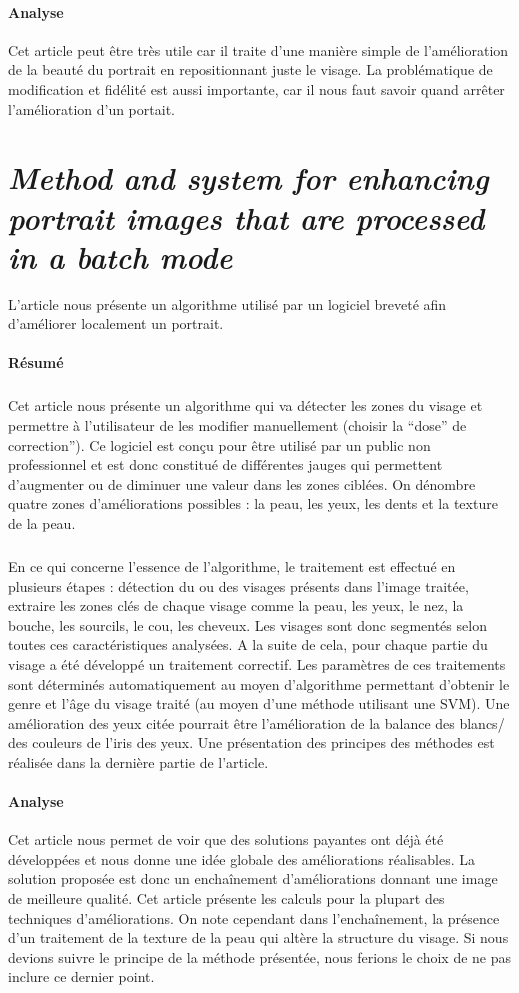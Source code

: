 \documentclass[11pt, french]{report-rd-info}
\begin{document}
\paragraph{Analyse}
Cet article peut être très utile car il traite d'une manière simple de l'amélioration de la beauté du portrait en repositionnant juste le visage. La problématique de modification et fidélité est aussi importante, car il nous faut savoir quand arrêter l'amélioration d'un portait.


\section{\emph{Method and system for enhancing portrait images that are processed in a batch mode}}
L'article \cite{Matraszek2004} nous présente un algorithme utilisé par un logiciel breveté afin d'améliorer localement un portrait.

\paragraph{Résumé}
\subparagraph{}
Cet article nous présente un algorithme qui va détecter les zones du visage et permettre à l'utilisateur de les modifier manuellement (choisir la “dose” de correction”). Ce logiciel est conçu pour être utilisé par un public non professionnel et est donc constitué de différentes jauges qui permettent d'augmenter ou de diminuer une valeur dans les zones ciblées. On dénombre quatre zones d'améliorations possibles : la peau, les yeux, les dents et la texture de la peau.
\subparagraph{}
En ce qui concerne l’essence de l’algorithme, le traitement est effectué en plusieurs étapes : détection du ou des visages présents dans l’image traitée, extraire les zones clés de chaque visage comme la peau, les yeux, le nez, la bouche, les sourcils, le cou, les cheveux. Les visages sont donc segmentés selon toutes ces caractéristiques analysées. A la suite de cela, pour chaque partie du visage a été développé un traitement correctif. Les paramètres de ces traitements sont déterminés automatiquement au moyen d’algorithme permettant d’obtenir le genre et l’âge du visage traité (au moyen d’une méthode utilisant une SVM).
Une amélioration des yeux citée pourrait être l’amélioration de la balance des blancs/ des couleurs de l’iris des yeux. Une présentation des principes des méthodes est réalisée dans la dernière partie de l’article.

\paragraph{Analyse}
Cet article nous permet de voir que des solutions payantes ont déjà été développées et nous donne une idée globale des améliorations réalisables. La solution proposée est donc un enchaînement d’améliorations donnant une image de meilleure qualité. Cet article présente les calculs pour la plupart des techniques d’améliorations. On note cependant dans l'enchaînement, la présence d’un traitement de la texture de la peau qui altère la structure du visage. Si nous devions suivre le principe de la méthode présentée, nous ferions le choix de ne pas inclure ce dernier point.
\end{document}
